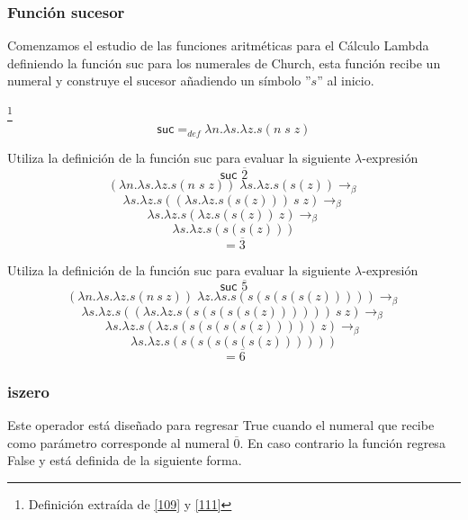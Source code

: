     \subsubsection{Función sucesor}
        Comenzamos el estudio de las funciones aritméticas para el Cálculo Lambda definiendo la función \textsf{suc} para los numerales de Church, esta función recibe un numeral y construye el sucesor añadiendo un símbolo ''$s$'' al inicio.
        \begin{definition}\footnote{Definición extraída de \hyperlink{109}{[109]} y  \hyperlink{111}{[111]}}
            $$\textsf{suc} =_{def} \lambda n.\lambda s.\lambda z. s(n \; s \; z)$$
        \end{definition}
     
        \begin{exercise}
            Utiliza la definición de la función \textsf{suc} para evaluar la siguiente  $\lambda$-expresión
            \[
                \textsf{suc } \overline{2}
            \]
            \[
                (\lambda n.\lambda s.\lambda z.s(n \; s \; z) ) \; \lambda s.\lambda z.s(s(z)) \rightarrow_\beta 
            \]
		\[
			\lambda s.\lambda z.s((\lambda s.\lambda z.s(s(z)))\ s \; z) \rightarrow_\beta 
		\]	
            \[
                 \lambda s.\lambda z.s(\lambda z.s(s(z))\ z) \rightarrow_\beta
            \]
		\[
			\lambda s.\lambda z.s(s(s(z)))
		\]
            \[
                = \overline{3}
            \]
        \end{exercise}

        \begin{exercise}
            Utiliza la definición de la función \textsf{suc} para evaluar la siguiente  $\lambda$-expresión
            \[
                \textsf{suc } \overline{5}
            \]
            \[
                (\lambda n.\lambda s.\lambda z.s(n\ s\ z)) \; \lambda z.\lambda s.s(s(s(s(s(z))))) \rightarrow_\beta
            \]
		\[
			 \lambda s.\lambda z.s((\lambda s.\lambda z.s(s(s(s(s(z))))))\ s\ z)  \rightarrow_\beta	
		\]
            \[
                \lambda s.\lambda z.s(\lambda z.s(s(s(s(s(z)))))\ z) \rightarrow_\beta 
            \]
		\[
			\lambda s.\lambda z.s(s(s(s(s(s(z))))))
		\]
            \[
                = \overline{6}
            \]
        \end{exercise}

        \subsubsection{iszero}
        	Este operador está diseñado para regresar \textsf{True} cuando el numeral que recibe como parámetro corresponde al numeral $\overline{0}$. En caso contrario la función regresa \textsf{False} y está definida de la siguiente forma.
        
